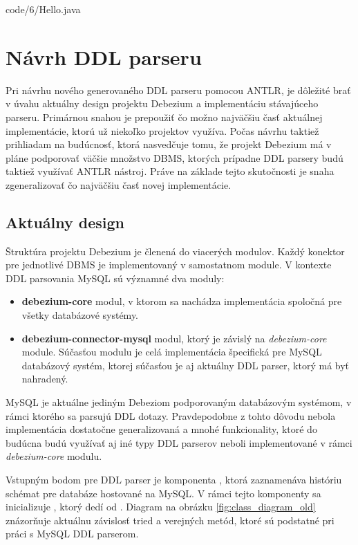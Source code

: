 \begin{minipage}{\linewidth}

            {code/6/Hello.java}
\end{minipage}

\section{Návrh DDL parseru}
Pri návrhu nového generovaného DDL parseru pomocou ANTLR, je dôležité brať v úvahu aktuálny design projektu Debezium a implementáciu stávajúceho parseru. Primárnou snahou je prepoužiť čo možno najväčšiu časť aktuálnej implementácie, ktorú už niekoľko projektov využíva. Počas návrhu taktiež prihliadam na budúcnosť, ktorá nasvedčuje tomu, že projekt Debezium má v pláne podporovať väčšie množstvo DBMS, ktorých prípadne DDL parsery budú taktiež využívať ANTLR nástroj. Práve na základe tejto skutočnosti je snaha zgeneralizovať čo najväčšiu časť novej implementácie.

\subsection{Aktuálny design}\label{old_design}
Štruktúra projektu Debezium je členená do viacerých modulov. Každý konektor pre jednotlivé DBMS je implementovaný v samostatnom module. V kontexte DDL parsovania MySQL sú významné dva moduly:
\begin{itemize}
\item \textbf{debezium-core} modul, v ktorom sa nachádza implementácia spoločná pre všetky databázové systémy.
\item \textbf{debezium-connector-mysql} modul, ktorý je závislý na \textit{debezium-core} module. Súčasťou modulu je celá implementácia špecifická pre MySQL databázový systém, ktorej súčasťou je aj aktuálny DDL parser, ktorý má byť nahradený.
\end{itemize}

MySQL je aktuálne jediným Debeziom podporovaným databázovým systémom, v rámci ktorého sa parsujú DDL dotazy. Pravdepodobne z tohto dôvodu nebola implementácia dostatočne generalizovaná a mnohé funkcionality, ktoré do budúcna budú využívať aj iné typy DDL parserov neboli implementované v rámci \textit{debezium-core} modulu.

Vstupným bodom pre DDL parser je komponenta , ktorá zaznamenáva históriu schémat pre databáze hostované na MySQL. V rámci tejto komponenty sa inicializuje , ktorý dedí od . Diagram na obrázku \ref{fig:class_diagram_old} znázorňuje aktuálnu závislosť tried a verejných metód, ktoré sú podstatné pri práci s MySQL DDL parserom.


